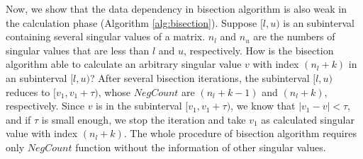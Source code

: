 Now, we show that the data dependency in bisection algorithm is also weak in the calculation phase (Algorithm \ref{alg:bisection}).
Suppose $[l,u)$ is an subinterval containing several singular values of a matrix.
$n_l$ and $n_u$ are the numbers of singular values that are less than $l$ and $u$, respectively.
How is the bisection algorithm able to calculate an arbitrary singular value $v$ with index $(n_l+k)$ in an subinterval $[l,u)$?
After several bisection iterations, the subinterval $[l,u)$ reduces to $[v_1,v_1+\tau)$, whose $NegCount$ are $(n_l+k-1)$ and $(n_l+k)$, respectively.
Since $v$ is in the subinterval $[v_1,v_1+\tau)$, we know that $| v_1 - v | < \tau$, and if $\tau$ is small enough, we stop the iteration and take $v_1$ as calculated singular value with index $(n_l+k)$.
The whole procedure of bisection algorithm requires only $NegCount$ function without the information of other singular values.


